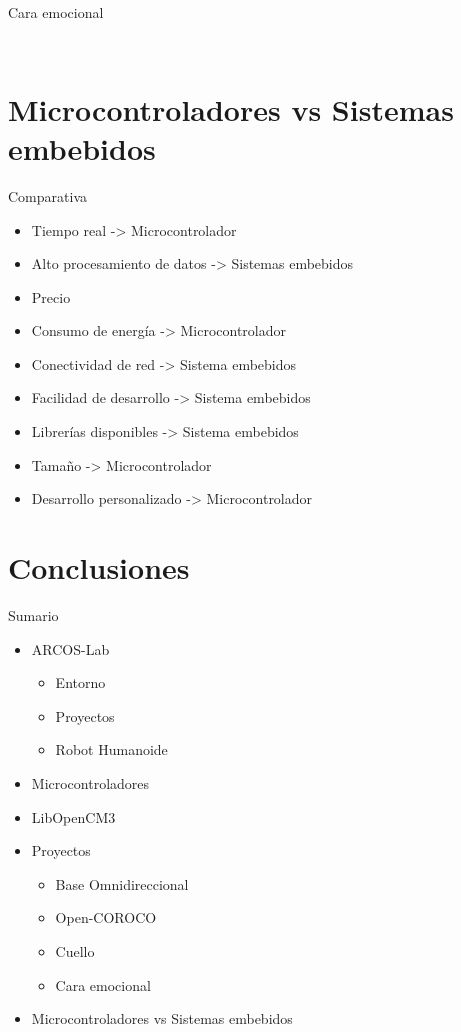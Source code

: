 \documentclass[10pt]{beamer}
\begin{document}
\begin{frame}{Cara emocional}
\begin{columns}
\begin{center}
\begin{figure}
				\end{figure}
			\end{center}
	\end{columns}
\end{frame}

\section{Microcontroladores vs Sistemas embebidos}

\begin{frame}{Comparativa}
	\begin{itemize}
		\item Tiempo real -> \alert{Microcontrolador}
        \item Alto procesamiento de datos -> \alert{Sistemas embebidos}
        \item Precio
        \item Consumo de energía -> \alert{Microcontrolador}
        \item Conectividad de red -> \alert{Sistema embebidos}
        \item Facilidad de desarrollo -> \alert{Sistema embebidos}
        \item Librerías disponibles -> \alert{Sistema embebidos}
        \item Tamaño -> \alert{Microcontrolador}
        \item Desarrollo personalizado -> \alert{Microcontrolador}
	\end{itemize}
\end{frame}

\section{Conclusiones}

\begin{frame}{Sumario}
   \begin{itemize}
      \item ARCOS-Lab
         \begin{itemize}
            \item Entorno
            \item Proyectos
            \item Robot Humanoide
         \end{itemize}
      \item Microcontroladores
      \item LibOpenCM3
      \item Proyectos
         \begin{itemize}
            \item Base Omnidireccional
            \item Open-COROCO
            \item Cuello
            \item Cara emocional
         \end{itemize}
      \item Microcontroladores vs Sistemas embebidos 
   \end{itemize}
\end{frame}
\end{document}
